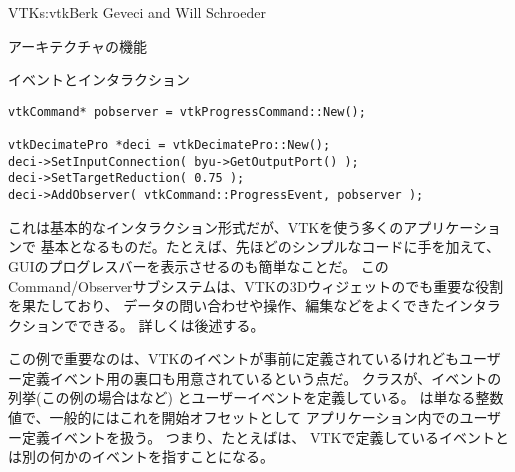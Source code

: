 \begin{aosachapter}{VTK}{s:vtk}{Berk Geveci and Will Schroeder}
\begin{aosasect1}{アーキテクチャの機能}
\begin{aosasect2}{イベントとインタラクション}
\begin{verbatim}
vtkCommand* pobserver = vtkProgressCommand::New();

vtkDecimatePro *deci = vtkDecimatePro::New();
deci->SetInputConnection( byu->GetOutputPort() );
deci->SetTargetReduction( 0.75 );
deci->AddObserver( vtkCommand::ProgressEvent, pobserver );
\end{verbatim}

これは基本的なインタラクション形式だが、VTKを使う多くのアプリケーションで
基本となるものだ。たとえば、先ほどのシンプルなコードに手を加えて、
GUIのプログレスバーを表示させるのも簡単なことだ。
このCommand/Observerサブシステムは、VTKの3Dウィジェットのでも重要な役割を果たしており、
データの問い合わせや操作、編集などをよくできたインタラクションでできる。
詳しくは後述する。

この例で重要なのは、VTKのイベントが事前に定義されているけれどもユーザー定義イベント用の裏口も用意されているという点だ。
クラスが、イベントの列挙(この例の場合はなど)
とユーザーイベントを定義している。
は単なる整数値で、一般的にはこれを開始オフセットとして
アプリケーション内でのユーザー定義イベントを扱う。
つまり、たとえばは、
VTKで定義しているイベントとは別の何かのイベントを指すことになる。


\end{aosasect2}
\end{aosasect1}
\end{aosachapter}
